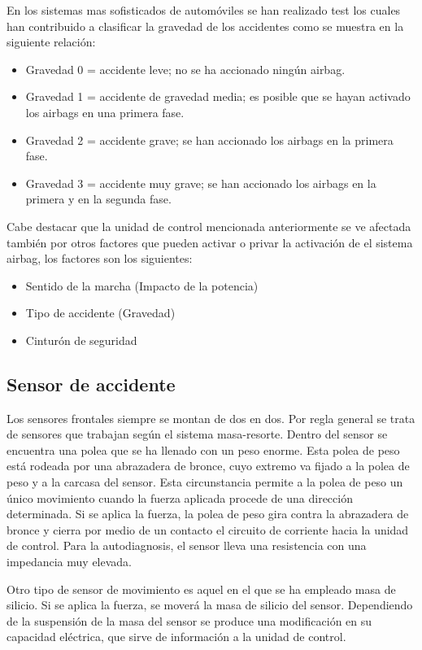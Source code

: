 En los sistemas mas sofisticados de automóviles se han realizado test los cuales han contribuido a clasificar la gravedad de los accidentes como se muestra en la siguiente relación:
\begin{itemize}


\item	Gravedad 0 = accidente leve; no se ha accionado ningún airbag.
\item	Gravedad 1 = accidente de gravedad media; es posible que se hayan activado los airbags en una primera fase.
\item	Gravedad 2 = accidente grave; se han accionado los airbags en la primera fase.
\item	Gravedad 3 = accidente muy grave; se han accionado los airbags en la primera y en la segunda fase.
\end{itemize}
Cabe destacar que la unidad de control mencionada anteriormente se ve afectada también por otros factores que pueden activar o privar la activación de el sistema airbag, los factores son los siguientes:
\begin{itemize}


\item	Sentido de la marcha (Impacto de la potencia)
\item	Tipo de accidente (Gravedad)
\item	Cinturón de seguridad
\end{itemize}
\subsection{Sensor de accidente}

Los sensores frontales siempre se montan de dos en dos. Por regla general se trata de sensores que trabajan según el sistema masa-resorte. Dentro del sensor se encuentra una polea que se ha llenado con un peso enorme. Esta polea de peso está rodeada por una abrazadera de bronce, cuyo extremo va fijado a la polea de peso y a la carcasa del sensor. Esta circunstancia permite a la polea de peso un único movimiento cuando la fuerza aplicada procede de una dirección determinada. Si se aplica la fuerza, la polea de peso gira contra la abrazadera de bronce y cierra por medio de un contacto el circuito de corriente hacia la unidad de control. Para la autodiagnosis, el sensor lleva una resistencia con una impedancia muy elevada.

Otro tipo de sensor de movimiento es aquel en el que se ha empleado masa de silicio. Si se aplica la fuerza, se moverá la masa de silicio del sensor. Dependiendo de la suspensión de la masa del sensor se produce una modificación en su capacidad eléctrica, que sirve de información a la unidad de control.

